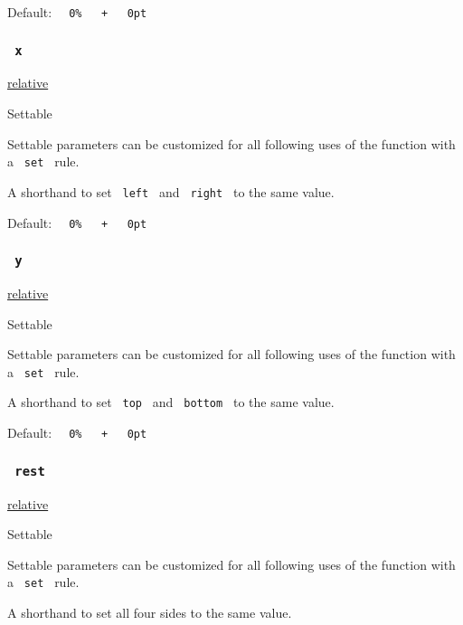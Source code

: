 Default:
\texttt{\ }{\texttt{\ 0\%\ }}\texttt{\ }{\texttt{\ +\ }}\texttt{\ }{\texttt{\ 0pt\ }}\texttt{\ }

\subsubsection{\texorpdfstring{\texttt{\ x\ }}{ x }}\label{parameters-x}

\href{/docs/reference/layout/relative/}{relative}

{{ Settable }}

\label{parameters-x-settable-tooltip}
Settable parameters can be customized for all following uses of the
function with a \texttt{\ set\ } rule.

A shorthand to set \texttt{\ left\ } and \texttt{\ right\ } to the same
value.

Default:
\texttt{\ }{\texttt{\ 0\%\ }}\texttt{\ }{\texttt{\ +\ }}\texttt{\ }{\texttt{\ 0pt\ }}\texttt{\ }

\subsubsection{\texorpdfstring{\texttt{\ y\ }}{ y }}\label{parameters-y}

\href{/docs/reference/layout/relative/}{relative}

{{ Settable }}

\label{parameters-y-settable-tooltip}
Settable parameters can be customized for all following uses of the
function with a \texttt{\ set\ } rule.

A shorthand to set \texttt{\ top\ } and \texttt{\ bottom\ } to the same
value.

Default:
\texttt{\ }{\texttt{\ 0\%\ }}\texttt{\ }{\texttt{\ +\ }}\texttt{\ }{\texttt{\ 0pt\ }}\texttt{\ }

\subsubsection{\texorpdfstring{\texttt{\ rest\ }}{ rest }}\label{parameters-rest}

\href{/docs/reference/layout/relative/}{relative}

{{ Settable }}

\label{parameters-rest-settable-tooltip}
Settable parameters can be customized for all following uses of the
function with a \texttt{\ set\ } rule.

A shorthand to set all four sides to the same value.


